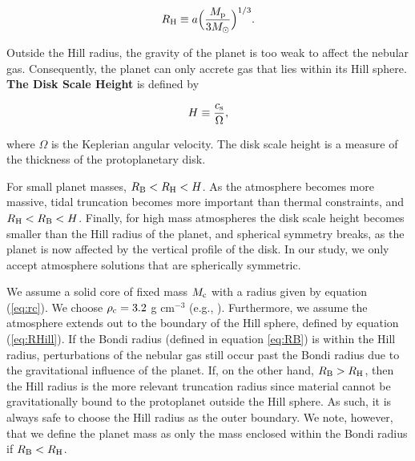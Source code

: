 \documentclass[apj]{emulateapj}
\newcommand{\co}{_{\rm c}}
\begin{document}
\begin{equation}
\label{eq:RHill}
R_{\rm H} \equiv a \Big(\frac{M_{\rm p}}{3 M_{\odot}}\Big)^{1/3}.
\end{equation}

\noindent Outside the Hill radius, the gravity of the planet is too weak to affect the nebular gas. Consequently, the planet can only accrete gas that lies within its Hill sphere. \\

\textbf{The Disk Scale Height} is defined by

\begin{equation}
\label{eq:H}
H \equiv \frac{c_{\rm s}}{\Omega},
\end{equation}

\noindent where $\Omega$ is the Keplerian angular velocity. The disk scale height is a measure of the thickness of the protoplanetary disk. %


For small planet masses, $R_{\rm B}<R_{\rm H}<H$. As the atmosphere becomes more massive, tidal truncation becomes more important than thermal constraints, and $R_{\rm H}<R_{\rm B}<H$. Finally, for high mass atmospheres the disk scale height becomes smaller than the Hill radius of the planet, and spherical symmetry breaks, as the planet is now affected by the vertical profile of the disk. In our study, we only accept atmosphere solutions that are spherically symmetric.

We assume a solid core of fixed mass $M\co$ with a radius given by equation (\ref{eq:rc}). We choose $\rho\co=3.2$ g cm$^{-3}$ (e.g., \citealt{pap99}). Furthermore, we assume the atmosphere extends out to the boundary of the Hill sphere, defined by equation (\ref{eq:RHill}). If the Bondi radius (defined in equation \ref{eq:RB}) is within the Hill radius, perturbations of the nebular gas still occur past the Bondi radius due to the gravitational influence of the planet. If, on the other hand, $R_{\rm B}>R_{\rm H}$, then the Hill radius is the more relevant truncation radius since material cannot be gravitationally bound to the protoplanet outside the Hill sphere. As such, it is always safe to choose the Hill radius as the outer boundary. We note, however, that we define the planet mass as only the mass enclosed within the Bondi radius if $R_{\rm B}<R_{\rm H}$.%
\end{document}
